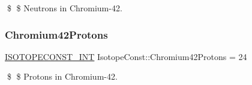 \$ \$ Neutrons in Chromium-\/42. \mbox{\label{group___isotope_const-_chromium-_cr42_ga6399b2692241b1bd3e7075b63bf79e68}} 
\subsubsection{\texorpdfstring{Chromium42\+Protons}{Chromium42Protons}}
{\footnotesize\ttfamily \mbox{\hyperlink{group___isotope_const-_macros_ga5f18360b3e99483a35c32d789e62621c}{I\+S\+O\+T\+O\+P\+E\+C\+O\+N\+S\+T\+\_\+\+I\+NT}} Isotope\+Const\+::\+Chromium42\+Protons = 24}

\$ \$ Protons in Chromium-\/42. 